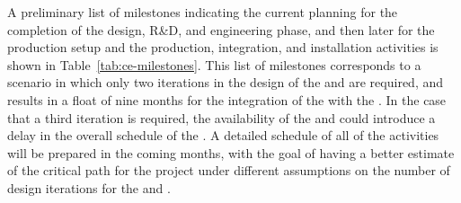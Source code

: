 A preliminary list of milestones indicating the current planning for the completion
of the design, R\&D, and engineering phase, and then later for the production setup
and the production, integration, and installation activities is shown in Table~\ref{tab:ce-milestones}.
This list of milestones corresponds to a scenario in which only two iterations in
the design of the  and  are required, and results in a float of nine months
for the integration of the  with the . In the case that a third
iteration is required, the availability of the  and  could introduce a 
delay in the overall schedule of the . 
A detailed schedule of all of the activities will be prepared in the coming months,
with the goal of having a better estimate of the critical path for the project
under different assumptions on the number of design iterations for the  and .

